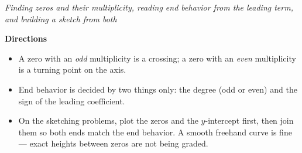 \documentclass[12pt]{article}
\begin{document}

\begin{center}
\small\textit{Finding zeros and their multiplicity, reading end behavior from the leading term, and building a sketch from both}
\end{center}

\noindent\textbf{Directions}
\begin{itemize}[leftmargin=1.1cm, itemsep=1pt, topsep=2pt]
  \item A zero with an \emph{odd} multiplicity is a crossing; a zero with an \emph{even} multiplicity is a turning point on the axis.
  \item End behavior is decided by two things only: the degree (odd or even) and the sign of the leading coefficient.
  \item On the sketching problems, plot the zeros and the $y$-intercept first, then join them so both ends match the end behavior. A smooth freehand curve is fine --- exact heights between zeros are not being graded.
\end{itemize}
\vspace{0.15cm}




\end{document}
